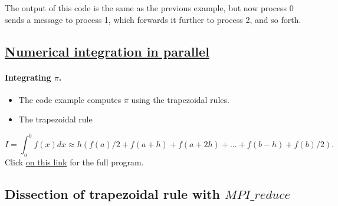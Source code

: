 The output of this code is the same as the previous example, but now
process 0 sends a message to process 1, which forwards it further
to process 2, and so forth.



\subsection*{\href{{https://github.com/CompPhysics/ComputationalPhysics2/blob/gh-pages/doc/Programs/LecturePrograms/programs/MPI/chapter07/program6.cpp}}{Numerical integration in parallel}}

\paragraph{Integrating $\pi$.}

\begin{itemize}
\item The code example computes $\pi$ using the trapezoidal rules.

\item The trapezoidal rule
\end{itemize}

\noindent
\[
   I=\int_a^bf(x) dx\approx h\left(f(a)/2 + f(a+h) +f(a+2h)+\dots +f(b-h)+ f(b)/2\right).
\]
Click \href{{https://github.com/CompPhysics/ComputationalPhysics2/blob/gh-pages/doc/Programs/LecturePrograms/programs/MPI/chapter07/program6.cpp}}{on this link} for the full program.



\subsection*{Dissection of trapezoidal rule with $MPI\_reduce$}

\paragraph{}


















